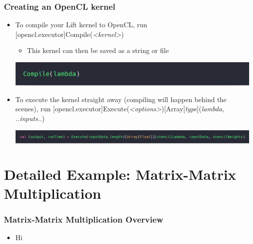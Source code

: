 \documentclass[10pt]{beamer}
\begin{document}
\begin{frame}
\frametitle{Creating an OpenCL kernel}
\begin{itemize}
    \item To compile your Lift kernel to OpenCL, run [opencl.executor]Compile(\textit{<kernel>}) 
        \begin{itemize}
                \item This kernel can then be saved as a string or file
        \end{itemize}
        \vspace{-.7cm}
        \begin{block}{}
        \begin{center}
            \includegraphics[width=.5\textwidth]{../images/simpleCompile.png}
        \end{center}
        \end{block}
    \item To execute the kernel straight away (compiling will happen behind the scenes), run [opencl.executor]Execute(\textit{<options>})[Array[\textit{type}](\textit{lambda}, \textit{..inputs..}) 
    \begin{block}{}
        \begin{center}
            \includegraphics[width=\textwidth]{../images/execute.png}
        \end{center}
    \end{block}
\end{itemize}
\end{frame}


\section{Detailed Example: Matrix-Matrix Multiplication }

\begin{frame}
\frametitle{Matrix-Matrix Multiplication Overview}
\vspace{.2cm}
\begin{itemize}
    \item Hi 
\end{itemize}
\vspace{-1.2cm}
\end{frame}
\end{document}
